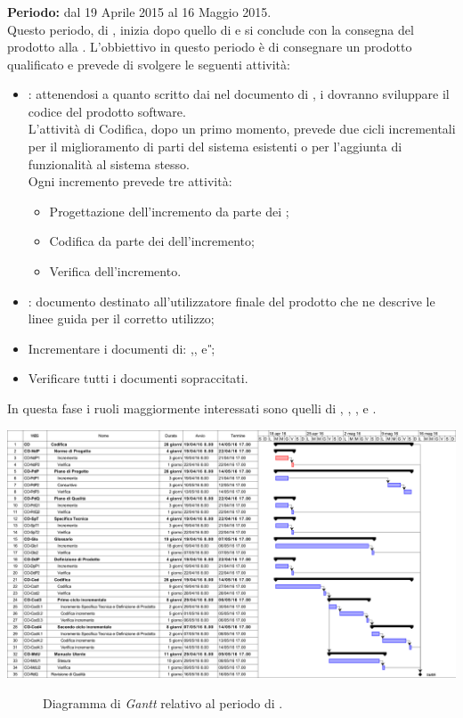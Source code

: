 \subsubsection{\CO}
\textbf{Periodo:} dal 19 Aprile 2015 al 16 Maggio 2015. \\
Questo periodo, di \CO, inizia dopo quello di \PD e si conclude con la consegna del prodotto alla \RQ. L'obbiettivo in questo periodo è di consegnare un prodotto qualificato e prevede di svolgere le seguenti attività:
\begin{itemize}
	\item \textbf{\CO}: attenendosi a quanto scritto dai \textit{\Prog} nel documento di \textit{\DDP}, i \textit{\Progrs} dovranno sviluppare il codice del prodotto software.\\
	L'attività di Codifica, dopo un primo momento, prevede due cicli incrementali per il miglioramento di parti del sistema esistenti o per l'aggiunta di funzionalità al sistema stesso. \\
	Ogni incremento prevede tre attività:
	\begin{itemize}
		\item Progettazione dell'incremento da parte dei \textit{\Progs};  
		\item Codifica da parte dei \textit{\Progrs} dell'incremento;
		\item Verifica dell'incremento. 
	\end{itemize}
	\item \textit{\MU}: documento destinato all'utilizzatore finale del prodotto che ne descrive le linee guida per il corretto utilizzo;
	\item Incrementare i documenti di: \textit{\NdP},\textit{\PdP}, \textit{\PdQ} e \textit{\G};
	\item Verificare tutti i documenti sopraccitati.
\end{itemize}
In questa fase i ruoli maggiormente interessati sono quelli di \textit{\Amm}, \textit{\Res}, \textit{\Prog}, \textit{\Progr} e \textit{\Ver}. 
\begin{center}
	\includegraphics[keepaspectratio = true, width=16cm]{immagini/PdP_CodificaGantt.png}
\end{center}
\begin{figure}[h]
	\caption{Diagramma di \textit{Gantt} relativo al periodo di \CO.}\label{etichetta}
\end{figure}

